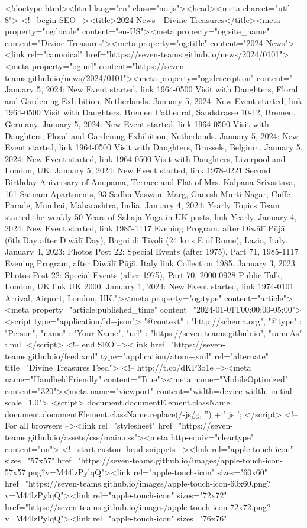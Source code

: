 <!doctype html><html lang="en" class="no-js"><head><meta charset="utf-8"> <!-- begin SEO --><title>2024 News - Divine Treasures</title><meta property="og:locale" content="en-US"><meta property="og:site_name" content="Divine Treasures"><meta property="og:title" content="2024 News"><link rel="canonical" href="https://seven-teams.github.io/news/2024/0101"><meta property="og:url" content="https://seven-teams.github.io/news/2024/0101"><meta property="og:description" content=" January 5, 2024: New Event started, link 1964-0500 Visit with Daughters, Floral and Gardening Exhibition, Netherlands. January 5, 2024: New Event started, link 1964-0500 Visit with Daughters, Bremen Cathedral, Sandstrasse 10-12, Bremen, Germany. January 5, 2024: New Event started, link 1964-0500 Visit with Daughters, Floral and Gardening Exhibition, Netherlands. January 5, 2024: New Event started, link 1964-0500 Visit with Daughters, Brussels, Belgium. January 5, 2024: New Event started, link 1964-0500 Visit with Daughters, Liverpool and London, UK. January 5, 2024: New Event started, link 1978-0221 Second Birthday Aniversary of Anupama, Terrace and Flat of Mrs. Kalpana Srivastava, 161 Satnam Apartments, 93 Sadhu Vaswani Marg, Ganesh Murti Nagar, Cuffe Parade, Mumbai, Maharashtra, India. January 4, 2024: Yearly Topics Team started the weakly 50 Years of Sahaja Yoga in UK posts, link Yearly. January 4, 2024: New Event started, link 1985-1117 Evening Program, after Diwālī Pūjā (6th Day after Diwālī Day), Bagni di Tivoli (24 kms E of Rome), Lazio, Italy. January 4, 2023: Photos Post 22: Special Events (after 1975), Part 71, 1985-1117 Evening Program, after Diwālī Pūjā, Italy link Collection 1985. January 3, 2023: Photos Post 22: Special Events (after 1975), Part 70, 2000-0928 Public Talk, London, UK link UK 2000. January 1, 2024: New Event started, link 1974-0101 Arrival, Airport, London, UK."><meta property="og:type" content="article"><meta property="article:published_time" content="2024-01-01T00:00:00-05:00"> <script type="application/ld+json"> { "@context" : "http://schema.org", "@type" : "Person", "name" : "Your Name", "url" : "https://seven-teams.github.io", "sameAs" : null } </script> <!-- end SEO --><link href="https://seven-teams.github.io/feed.xml" type="application/atom+xml" rel="alternate" title="Divine Treasures Feed"> <!-- http://t.co/dKP3o1e --><meta name="HandheldFriendly" content="True"><meta name="MobileOptimized" content="320"><meta name="viewport" content="width=device-width, initial-scale=1.0"> <script> document.documentElement.className = document.documentElement.className.replace(/\bno-js\b/g, '') + ' js '; </script> <!-- For all browsers --><link rel="stylesheet" href="https://seven-teams.github.io/assets/css/main.css"><meta http-equiv="cleartype" content="on"> <!-- start custom head snippets --><link rel="apple-touch-icon" sizes="57x57" href="https://seven-teams.github.io/images/apple-touch-icon-57x57.png?v=M44lzPylqQ"><link rel="apple-touch-icon" sizes="60x60" href="https://seven-teams.github.io/images/apple-touch-icon-60x60.png?v=M44lzPylqQ"><link rel="apple-touch-icon" sizes="72x72" href="https://seven-teams.github.io/images/apple-touch-icon-72x72.png?v=M44lzPylqQ"><link rel="apple-touch-icon" sizes="76x76" 
